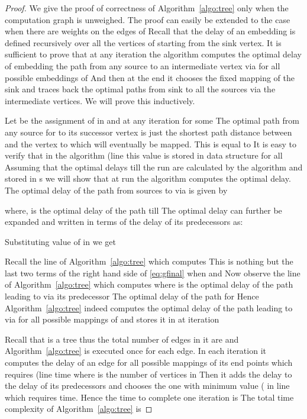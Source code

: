 \documentclass[journal]{IEEEtran}
\begin{document}
\begin{proof}
  We give the proof of correctness of Algorithm~\ref{algo:tree} only
  when the computation graph is unweighed. The proof can easily be
  extended to the case when there are weights on the edges of
   Recall that the delay of an embedding is defined
  recursively over all the vertices of  starting from the
  sink vertex. It is sufficient to prove that at any iteration  the
  algorithm computes the optimal delay of embedding the path from any
  source  to an intermediate vertex 
  via  for all possible embeddings of 
  And then at the end it chooses the fixed mapping of the sink
   and traces back the optimal paths from sink to all the
  sources via the intermediate vertices. We will prove this
  inductively.

  Let  be the assignment of  in  and at
  any iteration  for some  The optimal path from any source  for  to its successor vertex  is
  just the shortest path distance between  and the vertex to
  which  will eventually be mapped. This is equal
  to  It is easy to verify that in the
  algorithm (line  this value is stored in  data structure for all  Assuming that
  the optimal delays till the  run are calculated by the
  algorithm and stored in s we will show that at  run the
  algorithm computes the optimal delay. The optimal delay of the path
  from sources to  via  is given by
   
  where,  is the optimal delay of the path till
   The optimal delay  can further be
  expanded and written in terms of the delay of its predecessors as:
  
 Substituting value of  in  we get

Recall the line  of Algorithm~\ref{algo:tree} which computes
   This is
  nothing but the last two terms of the right hand side of
  \eqref{eq:gfinal} when  and  Now
  observe the line  of Algorithm~\ref{algo:tree} which computes
   where  is the
  optimal delay of the path leading to  via its predecessor
   The optimal delay of the path  for  Hence
  Algorithm~\ref{algo:tree} indeed computes the optimal delay of the
  path leading to  via  for all
  possible mappings  of  and
  stores it in  at iteration 

  Recall that  is a tree thus the total number of edges in
  it are  and Algorithm~\ref{algo:tree} is executed once for each
  edge. In each iteration it computes the delay of an edge for all
  possible mappings of its end points which requires  (line 
  time where  is the number of vertices in  Then it adds the
  delay to the delay of its predecessors and chooses the one with
  minimum value ( in line  which requires 
  time. Hence the time to complete one iteration is  The total time complexity of Algorithm~\ref{algo:tree} is
  
\end{proof}
\end{document}
